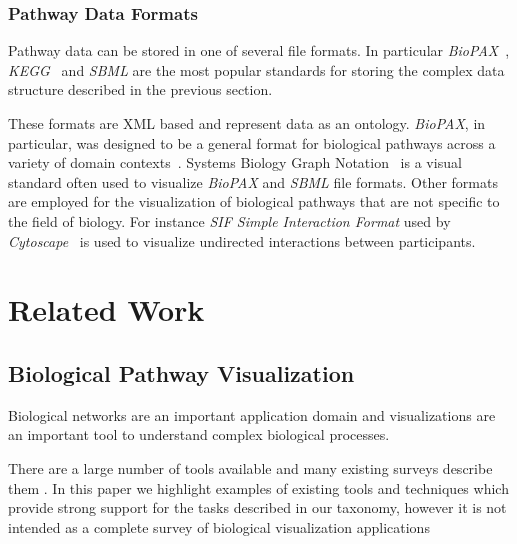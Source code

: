 \documentclass{egpubl}
\begin{document}
\subsubsection{Pathway Data Formats}

Pathway data can be stored in one of several file formats.
In particular \textit{BioPAX}~\cite{demir2010biopax}, \textit{KEGG}~\cite{kanehisa2000kegg} and \textit{SBML} \cite{Hucka2003} are the most popular standards for storing the complex data structure described in the previous section.

These formats are XML based and represent data as an ontology.
\emph{BioPAX}, in particular, was designed to be a general format for biological pathways across a variety of domain contexts~\cite{demir2010biopax}.
Systems Biology Graph Notation~\cite{Novere2009} is a visual standard often used to visualize \textit{BioPAX} and \textit{SBML} file formats.
Other formats are employed for the visualization of biological pathways that are not specific to the field of biology.
For instance \textit{SIF Simple Interaction Format} used by \textit{Cytoscape}~\cite{Shannon2003cytoscape} is used to visualize undirected interactions between participants.
\section{Related Work}
\subsection{Biological Pathway Visualization}
Biological networks are an important application domain and visualizations are an important tool to understand complex biological processes.

There are a large number of tools available and many existing surveys describe them \cite{Suderman2007tools,pavlopoulos2008survey,Gehlenborg2010omics}.
In this paper we highlight examples of existing tools and techniques which provide strong support for the tasks described in our taxonomy, however it is not intended as a complete survey of biological visualization applications

\end{document}
